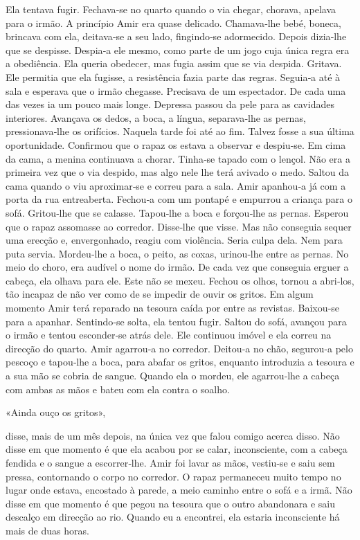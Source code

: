 Ela tentava fugir. Fechava­‑se no quarto quando o via chegar, chorava,
apelava para o irmão. A princípio Amir era quase delicado. Chamava­‑lhe
bebé, boneca, brincava com ela, deitava­‑se a seu lado, fingindo­‑se
adormecido. Depois dizia­‑lhe que se despisse. Despia­‑a ele mesmo, como
parte de um jogo cuja única regra era a obediência. Ela queria obedecer,
mas fugia assim que se via despida. Gritava. Ele permitia que ela
fugisse, a resistência fazia parte das regras. Seguia­‑a até à sala e
esperava que o irmão chegasse. Precisava de um espectador. De cada uma
das vezes ia um pouco mais longe. Depressa passou da pele para as
cavidades interiores. Avançava os dedos, a boca, a língua, separava­‑lhe
as pernas, pressionava­‑lhe os orifícios. Naquela tarde foi até ao fim.
Talvez fosse a sua última oportunidade. Confirmou que o rapaz os estava
a observar e despiu­‑se. Em cima da cama, a menina continuava a chorar.
Tinha­‑se tapado com o lençol. Não era a primeira vez que o via despido,
mas algo nele lhe terá avivado o medo. Saltou da cama quando o viu
aproximar­‑se e correu para a sala. Amir apanhou­‑a já com a porta da
rua entreaberta. Fechou­‑a com um pontapé e empurrou a criança para o
sofá. Gritou­‑lhe que se calasse. Tapou­‑lhe a boca e forçou­‑lhe as
pernas. Esperou que o rapaz assomasse ao corredor. Disse­‑lhe que visse.
Mas não conseguia sequer uma erecção e, envergonhado, reagiu com
violência. Seria culpa dela. Nem para puta servia. Mordeu­‑lhe a boca, o
peito, as coxas, urinou­‑lhe entre as pernas. No meio do choro, era
audível o nome do irmão. De cada vez que conseguia erguer a cabeça, ela
olhava para ele. Este não se mexeu. Fechou os olhos, tornou a abri­‑los,
tão incapaz de não ver como de se impedir de ouvir os gritos. Em algum
momento Amir terá reparado na tesoura caída por entre as revistas.
Baixou­‑se para a apanhar. Sentindo­‑se solta, ela tentou fugir. Saltou
do sofá, avançou para o irmão e tentou esconder­‑se atrás dele. Ele
continuou imóvel e ela correu na direcção do quarto. Amir agarrou­‑a no
corredor. Deitou­‑a no chão, segurou­‑a pelo pescoço e tapou­‑lhe a
boca, para abafar os gritos, enquanto introduzia a tesoura e a sua mão
se cobria de sangue. Quando ela o mordeu, ele agarrou­‑lhe a cabeça com
ambas as mãos e bateu com ela contra o soalho.

«Ainda ouço os gritos»,

disse, mais de um mês depois, na única vez que falou comigo acerca
disso. Não disse em que momento é que ela acabou por se calar,
inconsciente, com a cabeça fendida e o sangue a escorrer­‑lhe. Amir foi
lavar as mãos, vestiu­‑se e saiu sem pressa, contornando o corpo no
corredor. O rapaz permaneceu muito tempo no lugar onde estava, encostado
à parede, a meio caminho entre o sofá e a irmã. Não disse em que momento
é que pegou na tesoura que o outro abandonara e saiu descalço em
direcção ao rio. Quando eu a encontrei, ela estaria inconsciente há mais
de duas horas.

